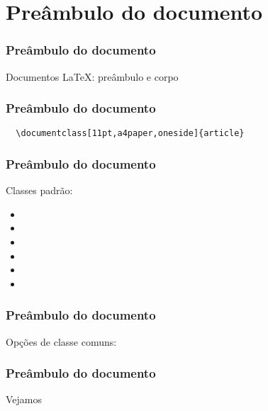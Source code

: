 \section{Preâmbulo do documento}

\begin{frame}
  \frametitle{Preâmbulo do documento}
  \LARGE
  Documentos \LaTeX: preâmbulo e corpo
\end{frame}

\begin{frame}[fragile]
  \frametitle{Preâmbulo do documento}
  \LARGE
  \begin{verbatim}
  \documentclass[11pt,a4paper,oneside]{article}
  \end{verbatim}
\end{frame}

\begin{frame}[fragile]
  \frametitle{Preâmbulo do documento}
  \LARGE
  Classes padrão:
  \begin{multicols}{2}
    \begin{itemize}
      \item{}
      \item{}
      \item{}
      \item{}
      \item{}
      \item{}
  \end{itemize}
\end{multicols}
\end{frame}

\begin{frame}
  \frametitle{Preâmbulo do documento}
  \LARGE
  Opções de classe comuns:
  \begin{itemize}
  \end{itemize}
\end{frame}

\begin{frame}
  \frametitle{Preâmbulo do documento}
  \huge
  Vejamos 
\end{frame}
